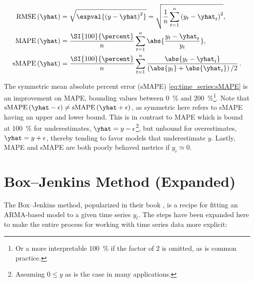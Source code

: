 \begin{subequations}\label{eq:time_series:RMSE_MAPE}
\begin{align}
\text{RMSE}\left(\yhat\right) &= \sqrt{\expval{\left(y - \yhat\right)^{2}}} = \sqrt{\frac{1}{n}\sum_{t=1}^{n} \left(y_{t} - \yhat_{t}\right)^{2}}, \label{eq:time_series:RMSE} \\
\text{MAPE}\left(\yhat\right) &= \frac{\SI{100}{\percent}}{n} \sum_{t=1}^{n} \abs{\frac{y_{t} - \yhat_{t}}{y_{t}}}, \label{eq:time_series:MAPE} \\
\text{sMAPE}\left(\yhat\right) &= \frac{\SI{100}{\percent}}{n} \sum_{t=1}^{n} \frac{\abs{y_{t} - \yhat_{t}}}{\left(\abs{y_{t}} + \abs{\yhat_{t}}\right)/2}\,. \label{eq:time_series:sMAPE}
\end{align}
\end{subequations}

The symmetric mean absolute percent error (sMAPE)
\cref{eq:time_series:sMAPE} is an improvement on MAPE,
bounding values between \SI{0}{\percent} and \SI{200}{\percent}\footnote{Or
a more interpretable \SI{100}{\percent} if the factor of $2$ is omitted, as is common practice.}.
Note that $\text{sMAPE}\left(\yhat - \epsilon \right) \neq \text{sMAPE}\left(\yhat + \epsilon \right)$,
as symmetric here refers to sMAPE having an upper and lower bound.
This is in contrast to MAPE which is
bound at \SI{100}{\percent} for underestimates, $\yhat = y - \epsilon$\footnote{Assuming
$0 \leq y$ as is the case in many applications.}, but
unbound for overestimates, $\yhat = y + \epsilon$,
thereby tending to favor models that underestimate $y$.
Lastly, MAPE and sMAPE are both poorly behaved metrics if $y_{i} \simeq 0$.

\section{Box--Jenkins Method (Expanded)}
\label{time_series:box_jenkins}

The Box--Jenkins method, popularized in their book \cite{boxjen76},
is a recipe for fitting an ARMA-based model to a given time series $y_{t}$.
The steps have been expanded here to make the entire process
for working with time series data more explicit:


